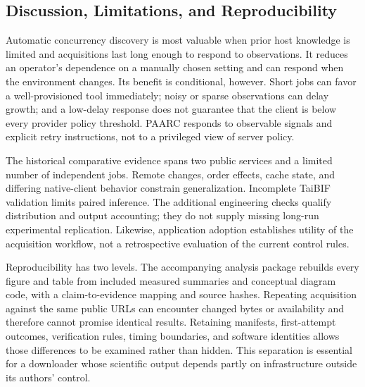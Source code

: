 

\subsection{Discussion, Limitations, and Reproducibility}
Automatic concurrency discovery is most valuable when prior host knowledge is limited and acquisitions last long enough to respond to observations. It reduces an operator's dependence on a manually chosen setting and can respond when the environment changes. Its benefit is conditional, however. Short jobs can favor a well-provisioned tool immediately; noisy or sparse observations can delay growth; and a low-delay response does not guarantee that the client is below every provider policy threshold. PAARC responds to observable signals and explicit retry instructions, not to a privileged view of server policy.

The historical comparative evidence spans two public services and a limited number of independent jobs. Remote changes, order effects, cache state, and differing native-client behavior constrain generalization. Incomplete TaiBIF validation limits paired inference. The additional engineering checks qualify distribution and output accounting; they do not supply missing long-run experimental replication. Likewise, application adoption establishes utility of the acquisition workflow, not a retrospective evaluation of the current control rules.

Reproducibility has two levels. The accompanying analysis package rebuilds every figure and table from included measured summaries and conceptual diagram code, with a claim-to-evidence mapping and source hashes. Repeating acquisition against the same public URLs can encounter changed bytes or availability and therefore cannot promise identical results. Retaining manifests, first-attempt outcomes, verification rules, timing boundaries, and software identities allows those differences to be examined rather than hidden. This separation is essential for a downloader whose scientific output depends partly on infrastructure outside its authors' control.
